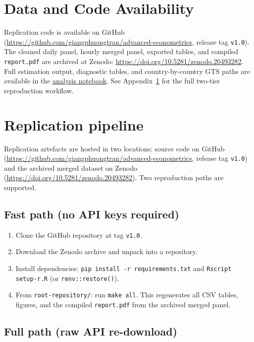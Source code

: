 \documentclass[12pt,a4paper]{article}
\begin{document}
\section*{Data and Code Availability}

Replication code is available on GitHub (\url{https://github.com/giangphuongtran/advanced-econometrics}, release tag \texttt{v1.0}). 
The cleaned daily panel, hourly merged panel, exported tables, and compiled \texttt{report.pdf} are archived at Zenodo: \url{https://doi.org/10.5281/zenodo.20493282}.
Full estimation output, diagnostic tables, and country-by-country GTS paths are available in the \href{../combined-analysis.html}{analysis notebook}. See Appendix~\ref{app:replication} for the full two-tier reproduction workflow.




\appendix

\section{Replication pipeline}
\label{app:replication}

Replication artefacts are hosted in two locations: source code on GitHub (\url{https://github.com/giangphuongtran/advanced-econometrics}, release tag \texttt{v1.0}) and the archived merged dataset on Zenodo (\url{https://doi.org/10.5281/zenodo.20493282}). Two reproduction paths are supported.

\subsection*{Fast path (no API keys required)}

\begin{enumerate}
  \item Clone the GitHub repository at tag \texttt{v1.0}.
  \item Download the Zenodo archive and unpack into a repository.
  \item Install dependencies: \texttt{pip install -r requirements.txt} and \texttt{Rscript setup-r.R} (or \texttt{renv::restore()}).
  \item From \texttt{root-repository/}: run \texttt{make all}. This regenerates all CSV tables, figures, and the compiled \texttt{report.pdf} from the archived merged panel.
\end{enumerate}

\subsection*{Full path (raw API re-download)}
\end{document}
